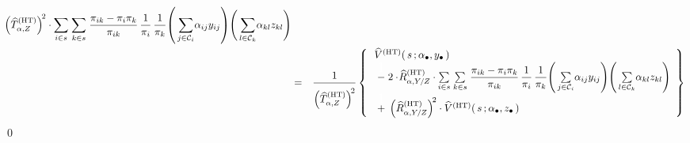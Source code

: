 \begin{enumerate}
\begin{eqnarray*}
{{                \left(\widehat{T}^{\textnormal{(HT)}}_{\alpha,Z}\right)^{\!2}
                }
            }
        \cdot
        \underset{i \in s}{\sum}\;
        \underset{k \in s}{\sum}\;
        \dfrac{
            \pi_{ik} \overset{{\color{white}.}}{-} \pi_{i}\pi_{k}
            }{
            \pi_{ik}
            }
        \,
        \dfrac{1}{\pi_{i}}
        \,
        \dfrac{1}{\pi_{k}}
        \!
        \left(\,
            \underset{j\in\mathcal{C}_{i}}{\sum}\alpha_{ij}y_{ij}
            \right)
        \!
        \left(\,
            \underset{l\in\mathcal{C}_{k}}{\sum}\alpha_{kl}z_{kl}
            \right)
    \\
    & = &
        \dfrac{
            1
            }{
            \overset{{\color{white}.}}{
                \left(\widehat{T}^{\textnormal{(HT)}}_{\alpha,Z}\right)^{\!2}
                }
            }
        \left\{\,
            \begin{array}{l}
                \widehat{V}^{\textnormal{(HT)}}(\,s\,;\abullet,\ydot\,)
                \\
                \; \overset{{\color{white}\textnormal{\Large$1$}}}{-} \;
                2\cdot\!
                \widehat{R}^{\textnormal{(HT)}}_{\alpha,Y/Z}
                \cdot
                \underset{i \in s}{\sum}\;
                \underset{k \in s}{\sum}\;
                \dfrac{
                    \pi_{ik} \overset{{\color{white}.}}{-} \pi_{i}\pi_{k}
                    }{
                    \pi_{ik}
                    }
                \,
                \dfrac{1}{\pi_{i}}
                \,
                \dfrac{1}{\pi_{k}}
                \!
                \left(\,
                    \underset{j\in\mathcal{C}_{i}}{\sum}\alpha_{ij}y_{ij}
                    \right)
                \!
                \left(\,
                    \underset{l\in\mathcal{C}_{k}}{\sum}\alpha_{kl}z_{kl}
                    \right)
                \\
                \; \overset{{\color{white}\textnormal{\Large$1$}}}{+} \;
                \left(\widehat{R}^{\textnormal{(HT)}}_{\alpha,Y/Z}\right)^{\!2}
                \cdot
                \widehat{V}^{\textnormal{(HT)}}(\,s\,;\abullet,\zdot\,)
                \end{array}
            \right\}
    \end{eqnarray*}
    \vskip -0.5cm
    \qed
\end{enumerate}

